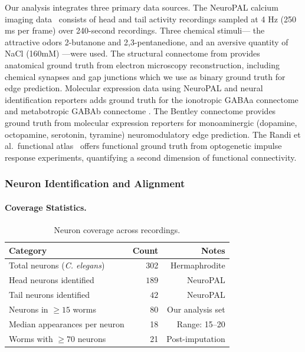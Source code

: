 \documentclass{article}
\theoremstyle{plain}
\theoremstyle{definition}
\theoremstyle{remark}
\newcommand{\1}{\mathbf{1}}
\begin{document}
Our analysis integrates three primary data sources. The NeuroPAL calcium imaging data~\citep{Yemini2021} consists of head and tail activity recordings sampled at 4 Hz (250 ms per frame) over 240-second recordings. Three chemical stimuli--- the attractive odors 2-butanone and 2,3-pentanedione, and an aversive quantity of NaCl (160mM) ---were used. The structural connectome from \citet{white1986structure, Cook2019} provides anatomical ground truth from electron microscopy reconstruction, including chemical synapses and gap junctions which we use as binary ground truth for edge prediction. Molecular expression data using NeuroPAL and neural identification reporters adds ground truth for the ionotropic GABAa connectome and metabotropic GABAb connectome \cite{Yemini2021}. The Bentley connectome \cite{bentley2016multilayer} provides ground truth from molecular expression reporters for monoaminergic (dopamine, octopamine, serotonin, tyramine) neuromodulatory edge prediction. The Randi et al.\ functional atlas~\citep{Randi2023} offers functional ground truth from optogenetic impulse response experiments, quantifying a second dimension of functional connectivity.

\subsubsection{Neuron Identification and Alignment}

\paragraph{Coverage Statistics.}
\begin{table}[h!]
\centering
\caption{Neuron coverage across recordings.}
\label{tab:coverage}
\begin{tabular}{lrr}
\toprule
\textbf{Category} & \textbf{Count} & \textbf{Notes} \\
\midrule
Total neurons (\emph{C. elegans}) & 302 & Hermaphrodite \\
Head neurons identified & $189$ & NeuroPAL \\
Tail neurons identified & $42$ & NeuroPAL \\
Neurons in $\geq 15$ worms & 80 & Our analysis set \\
Median appearances per neuron & 18 & Range: 15--20 \\
Worms with $\geq 70$ neurons & 21 & Post-imputation \\
\bottomrule
\end{tabular}
\end{table}
\end{document}
